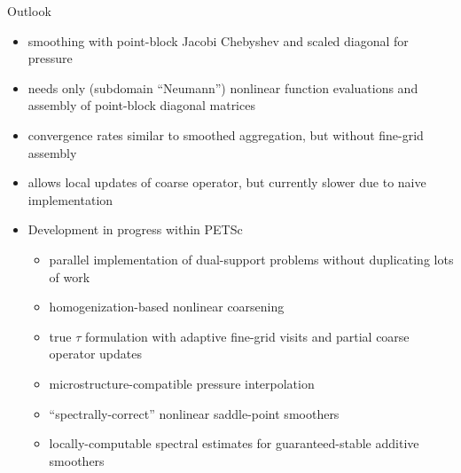 \documentclass{beamer}
\begin{document}


















\begin{frame}{Outlook}
  \begin{itemize}
  \item smoothing with point-block Jacobi Chebyshev and scaled diagonal for pressure
  \item needs only (subdomain ``Neumann'') nonlinear function evaluations and assembly of point-block diagonal matrices
  \item convergence rates similar to smoothed aggregation, but without fine-grid assembly
  \item allows local updates of coarse operator, but currently slower due to naive implementation
  \item Development in progress within PETSc
    \begin{itemize}
    \item parallel implementation of dual-support problems without duplicating lots of work
    \item homogenization-based nonlinear coarsening
    \item true $\tau$ formulation with adaptive fine-grid visits and partial coarse operator updates
    \item microstructure-compatible pressure interpolation
    \item ``spectrally-correct'' nonlinear saddle-point smoothers
    \item locally-computable spectral estimates for guaranteed-stable additive smoothers
    \end{itemize}
  \end{itemize}
\end{frame}
\end{document}
